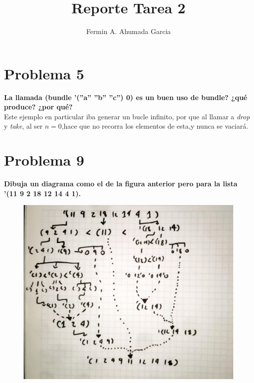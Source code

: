 \documentclass[11pt,a4paper]{report}
\author{Fermin A. Ahumada Garcia}
\title{Reporte Tarea 2}
\begin{document}
\maketitle
\section*{Problema 5 }
\textbf{La llamada (bundle ’(”a” ”b” ”c”) 0) es un buen uso de bundle? ¿qué produce? ¿por qué?}\\
Este ejemplo en particular iba generar un bucle infinito, por que al llamar a \textit{drop} y \textit{take}, al ser  $n = 0$,hace que no recorra los elementos de esta,y nunca se vaciará.
\section*{Problema 9}
\textbf{Dibuja un diagrama como el de la figura anterior pero para la lista ’(11 9 2 18 12
14 4 1).}\\
\begin{figure}[ht]
\includegraphics[width=15cm]{image}
\centering
\end{figure}
\end{document}
